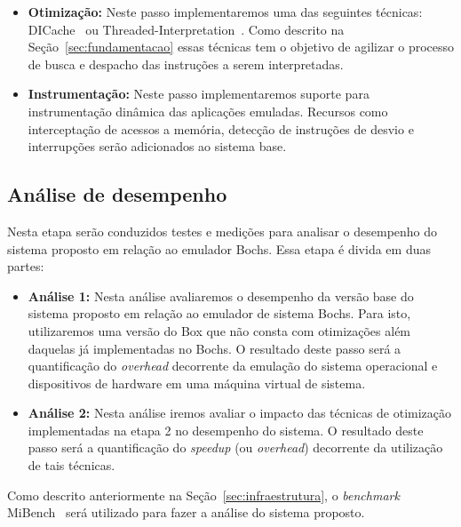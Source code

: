\documentclass[11pt,twoside]{article}
\begin{document}
\begin{itemize}
    \item \textbf{Otimização:} Neste passo implementaremos uma das seguintes 
    técnicas: DICache~\cite{Chen2012} ou Threaded-Interpretation~\cite{Klint1981}.
    Como descrito na Seção~\ref{sec:fundamentacao} essas técnicas tem o objetivo 
    de agilizar o processo de busca e despacho das instruções a serem interpretadas.
 
    \item \textbf{Instrumentação:} Neste passo implementaremos suporte para 
    instrumentação dinâmica das aplicações emuladas. Recursos como interceptação
    de acessos a memória, detecção de instruções de desvio e interrupções serão 
    adicionados ao sistema base.
\end{itemize}
 
\subsection{Análise de desempenho}

Nesta etapa serão conduzidos testes e medições para analisar o desempenho do sistema
proposto em relação ao emulador Bochs. Essa etapa é divida em duas partes:

\begin{itemize}
    \item \textbf{Análise 1:} Nesta análise avaliaremos o desempenho da versão 
    base do sistema proposto em relação ao emulador de sistema Bochs. Para 
    isto, utilizaremos uma versão do Box que não consta com otimizações além 
    daquelas já implementadas no Bochs. O resultado deste passo será a quantificação
    do \textit{overhead} decorrente da emulação do sistema operacional e dispositivos de
    hardware em uma máquina virtual de sistema. 
    
    \item \textbf{Análise 2:} Nesta análise iremos avaliar o impacto das técnicas 
    de otimização implementadas na etapa 2 no desempenho do sistema. O resultado
    deste passo será a quantificação do \textit{speedup} (ou \textit{overhead}) decorrente da 
    utilização de tais técnicas.
\end{itemize}

Como descrito anteriormente na Seção~\ref{sec:infraestrutura}, o \textit{benchmark} 
MiBench~\cite{Guthaus2001} será utilizado para fazer a análise do sistema
proposto.
\end{document}
